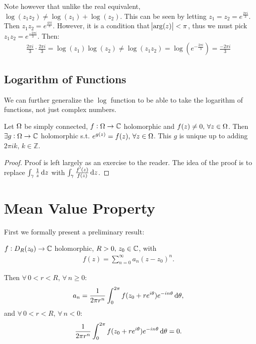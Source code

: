 \begin{example}
Note however that unlike the real equivalent, $\log(z_1 z_2) \neq \log(z_1) + \log(z_2)$. This can be seen by letting $z_1 = z_2 = e^{\frac{2 \pi i}{3}}$. Then $z_1 z_2 = e^{\frac{4 \pi i}{3}}$. However, it is a condition that $\abs{ \arg (z)} < \pi$, thus we must pick $z_1 z_2 = e^{\frac{-2 \pi i}{3}}$. Then:
\begin{align*}
    \frac{2 \pi i }{3} \cdot \frac{2 \pi i }{3} = \log(z_1) \log ( z_2 ) \neq \log ( z_1 z_2 ) = \log \left( e^{ - \frac{2 \pi i}{3}} \right) = \frac{- 2 \pi i}{3}
\end{align*}
\end{example}


\subsection{Logarithm of Functions}

We can further generalize the $\log$ function to be able to take the logarithm of functions, not just complex numbers.

\begin{theorem}\label{thm:complex-log-super}
Let $\Omega$ be simply connected, $f:\Omega \rightarrow \mathbb{C}$ holomorphic and $f(z) \neq 0, \, \forall z \in \Omega$. Then $\exists g: \Omega \to \mathbb{C}$ holomorphic s.t. $e^{g(z)} = f(z), \, \forall z \in \Omega$. This $g$ is unique up to adding $2 \pi i k, \, k \in \mathbb{Z}$.
\end{theorem}

\begin{proof}
Proof is left largely as an exercise to the reader. The idea of the proof is to replace $\int_\gamma \frac{1}{z} \dif z$ with $\int_\gamma \frac{f'(z)}{f(z)} \dif z$.
\end{proof}

\section{Mean Value Property}

First we formally present a preliminary result:

\begin{proposition}\label{prop:prelim-mvp}
$f: D_R(z_0) \to \mathbb{C}$ holomorphic, $R> 0, \, z_0 \in \mathbb{C}$, with
\begin{align*}
    f(z) = \sum_{n=0}^ \infty a_n (z-z_0)^n.
\end{align*}

Then $\forall \, 0 < r< R$, $\forall \, n \geq 0$:
\begin{align*}
    a_n = \frac{1}{2 \pi r^n} \int_0^{2 \pi} f ( z_0 + re^{i \theta} ) e^{-i n \theta } \dif \theta,
\end{align*}
and $\forall \, 0 < r< R$, $\forall \, n < 0$:
\begin{align*}
    \frac{1}{2 \pi r^n} \int_0^{2 \pi} f ( z_0 + re^{i \theta} ) e^{-i n \theta } \dif \theta = 0 .
\end{align*}
\end{proposition}


